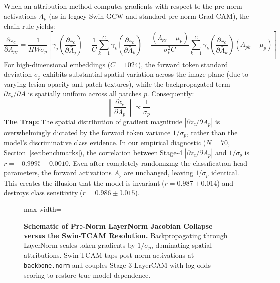 \documentclass[11pt,a4paper]{article}
\begin{document}
When an attribution method computes gradients with respect to the pre-norm activations $A_p$ (as in legacy Swin-GCW and standard pre-norm Grad-CAM), the chain rule yields:
\begin{equation}
\label{eq:layernorm_jacobian}
\frac{\partial z_c}{\partial A_{pj}} = \frac{1}{HW \sigma_p} \left[ \gamma_j \left( \frac{\partial z_c}{\partial \bar{A}_j} \right) - \frac{1}{C} \sum_{k=1}^C \gamma_k \left( \frac{\partial z_c}{\partial \bar{A}_k} \right) - \frac{(A_{pj} - \mu_p)}{\sigma_p^2 C} \sum_{k=1}^C \gamma_k \left( \frac{\partial z_c}{\partial \bar{A}_k} \right) (A_{pk} - \mu_p) \right]
\end{equation}
For high-dimensional embeddings ($C = 1024$), the forward token standard deviation $\sigma_p$ exhibits substantial spatial variation across the image plane (due to varying lesion opacity and patch textures), while the backpropagated term $\partial z_c / \partial \bar{A}$ is spatially uniform across all patches $p$. Consequently:
\begin{equation}
\left\| \frac{\partial z_c}{\partial A_p} \right\| \propto \frac{1}{\sigma_p}
\end{equation}
\textbf{The Trap:} The spatial distribution of gradient magnitude $|\partial z_c / \partial A_p|$ is overwhelmingly dictated by the forward token variance $1/\sigma_p$, rather than the model's discriminative class evidence. In our empirical diagnostic ($N=70$, Section~\ref{sec:benchmarks}), the correlation between Stage-4 $|\partial z_c / \partial A_p|$ and $1/\sigma_p$ is $r = +0.9995 \pm 0.0010$. Even after completely randomizing the classification head parameters, the forward activations $A_p$ are unchanged, leaving $1/\sigma_p$ identical. This creates the illusion that the model is invariant ($r = 0.987 \pm 0.014$) and destroys class sensitivity ($r = 0.986 \pm 0.015$).

\begin{figure}[t]
\centering
\begin{adjustbox}{max width=\textwidth}

\end{adjustbox}
\caption{\textbf{Schematic of Pre-Norm LayerNorm Jacobian Collapse versus the Swin-TCAM Resolution.} Backpropagating through LayerNorm scales token gradients by $1/\sigma_p$, dominating spatial attributions. Swin-TCAM taps post-norm activations at \texttt{backbone.norm} and couples Stage-3 LayerCAM with log-odds scoring to restore true model dependence.}
\label{fig:tikz_layernorm_diag}
\end{figure}
\end{document}
